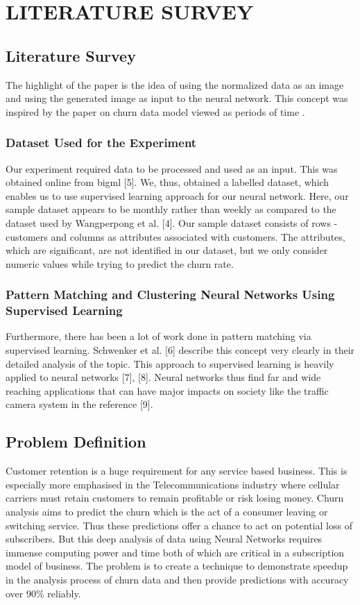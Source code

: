 

\chapter{LITERATURE SURVEY}

\section{Literature Survey}

\hspace{0.9cm} The highlight of the paper is the idea of using the normalized
data as an image and using the generated image as input
to the neural network. This concept was inspired by the paper
on churn data model viewed as periods of time \cite{citation-2}.
\subsection{Dataset Used for the Experiment}
Our experiment required data to be processed and used
as an input. This was obtained online from bigml [5]. We,
thus, obtained a labelled dataset, which enables us to use
supervised learning approach for our neural network. Here,
our sample dataset appears to be monthly rather than weekly
as compared to the dataset used by Wangperpong et al. [4].
Our sample dataset consists of rows - customers and columns
as attributes associated with customers. The attributes, which
are significant, are not identified in our dataset, but we only
consider numeric values while trying to predict the churn rate.
\subsection{Pattern Matching and Clustering Neural Networks Using Supervised Learning}
Furthermore, there has been a lot of work done in pattern
matching via supervised learning. Schwenker et al. [6] describe
this concept very clearly in their detailed analysis of the
topic. This approach to supervised learning is heavily applied
to neural networks [7], [8]. Neural networks thus find far and
wide reaching applications that can have major impacts on
society like the traffic camera system in the reference [9].

\section{Problem Definition}

\hspace{0.9cm} Customer retention is a huge requirement for any service based business. This is especially more emphasised in the Telecommunications industry where cellular carriers must retain customers to remain profitable or risk losing money. Churn analysis aims to predict the churn which is the act of a consumer leaving or switching service. Thus these predictions offer a chance to act on potential loss of subscribers. But this deep analysis of data using Neural Networks requires immense computing power and time both of which are critical in a subscription model of business. The problem is to create a technique to demonstrate speedup in the analysis process of churn data and then provide predictions with accuracy over 90\% reliably.

